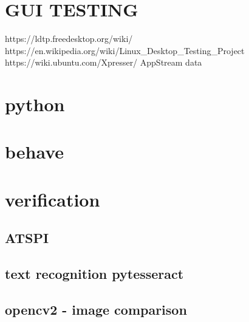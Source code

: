 \chapter{GUI TESTING}
https://ldtp.freedesktop.org/wiki/
https://en.wikipedia.org/wiki/Linux_Desktop_Testing_Project
https://wiki.ubuntu.com/Xpresser/
AppStream data
\chapter{python}
\chapter{behave}
\chapter{verification}
\section{ATSPI}
\section{text recognition pytesseract}
\section{opencv2 - image comparison}